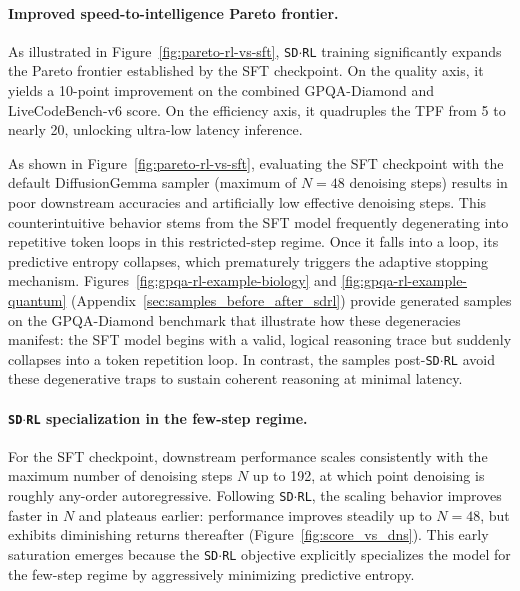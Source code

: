 \documentclass[11pt, a4paper, logo, copyright, gdm]{google}
\newcommand{\sdrl}{\texttt{{\small SD$\cdot$RL}}\xspace}
\begin{document}
\paragraph{Improved speed-to-intelligence Pareto frontier.} As illustrated in Figure~\ref{fig:pareto-rl-vs-sft}, \sdrl training significantly expands the Pareto frontier established by the SFT checkpoint. On the quality axis, it yields a 10-point improvement on the combined GPQA-Diamond and LiveCodeBench-v6 score. On the efficiency axis, it quadruples the TPF from 5 to nearly 20, unlocking ultra-low latency inference.

As shown in Figure~\ref{fig:pareto-rl-vs-sft}, evaluating the SFT checkpoint with the default DiffusionGemma sampler (maximum of $N=48$ denoising steps) results in poor downstream accuracies and artificially low effective denoising steps. This counterintuitive behavior stems from the SFT model frequently degenerating into repetitive token loops in this restricted-step regime. Once it falls into a loop, its predictive entropy collapses, which prematurely triggers the adaptive stopping mechanism. Figures~\ref{fig:gpqa-rl-example-biology} and \ref{fig:gpqa-rl-example-quantum} (Appendix~\ref{sec:samples_before_after_sdrl}) provide generated samples on the GPQA-Diamond benchmark that illustrate how these degeneracies manifest: the SFT model begins with a valid, logical reasoning trace but suddenly collapses into a token repetition loop. In contrast, the samples post-\sdrl avoid these degenerative traps to sustain coherent reasoning at minimal latency.


\paragraph{\sdrl specialization in the few-step regime.} For the SFT checkpoint, downstream performance scales consistently with the maximum number of denoising steps $N$ up to 192, at which point denoising is roughly any-order autoregressive. Following \sdrl, the scaling behavior improves faster in $N$ and plateaus earlier: performance improves steadily up to $N=48$, but exhibits diminishing returns thereafter (Figure~\ref{fig:score_vs_dns}). This early saturation emerges because the \sdrl objective explicitly specializes the model for the few-step regime by aggressively minimizing predictive entropy.
\end{document}
